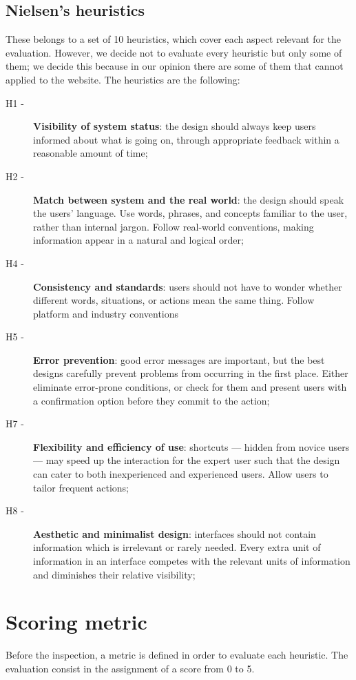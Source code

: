 \subsection{Nielsen's heuristics}
These belongs to a set of 10 heuristics, which cover each aspect relevant for the evaluation. However, we decide not to evaluate every heuristic but only some of them; we decide this because in our opinion there are some of them that cannot applied to the website.
The heuristics are the following:
\begin{description} 
\item[H1 -] \textbf{Visibility of system status}: the design should always keep users informed about what is going on, through appropriate feedback within a reasonable amount of time;
\item[H2 -] \textbf{Match between system and the real world}: the design should speak the users' language. Use words, phrases, and concepts familiar to the user, rather than internal jargon. Follow real-world conventions, making information appear in a natural and logical order;
\item[H4 -] \textbf{Consistency and standards}: users should not have to wonder whether different words, situations, or actions mean the same thing. Follow platform and industry conventions
\item[H5 -] \textbf{Error prevention}: good error messages are important, but the best designs carefully prevent problems from occurring in the first place. Either eliminate error-prone conditions, or check for them and present users with a confirmation option before they commit to the action;
\item[H7 -] \textbf{Flexibility and efficiency of use}: shortcuts — hidden from novice users — may speed up the interaction for the expert user such that the design can cater to both inexperienced and experienced users. Allow users to tailor frequent actions;
\item[H8 -] \textbf{Aesthetic and minimalist design}: interfaces should not contain information which is irrelevant or rarely needed. Every extra unit of information in an interface competes with the relevant units of information and diminishes their relative visibility;
\end{description}


\section{Scoring metric}
Before the inspection, a metric is defined in order to evaluate each heuristic. The evaluation consist in the assignment of a score from 0 to 5. 

